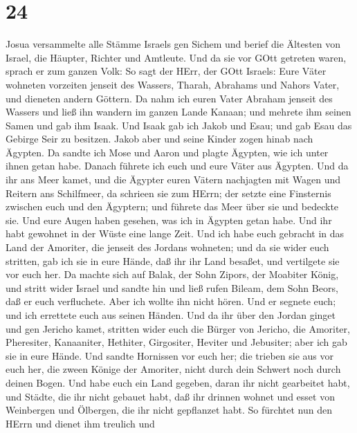 \hypertarget{section-23}{%
\section{24}\label{section-23}}

 Josua versammelte alle Stämme Israels gen Sichem und berief
die Ältesten von Israel, die Häupter, Richter und Amtleute. Und da sie
vor GOtt getreten waren,  sprach er zum ganzen Volk: So sagt
der HErr, der GOtt Israels: Eure Väter wohneten vorzeiten jenseit des
Wassers, Tharah, Abrahams und Nahors Vater, und dieneten andern Göttern.
 Da nahm ich euren Vater Abraham jenseit des Wassers und
ließ ihn wandern im ganzen Lande Kanaan; und mehrete ihm seinen Samen
und gab ihm Isaak.  Und Isaak gab ich Jakob und Esau; und
gab Esau das Gebirge Seir zu besitzen. Jakob aber und seine Kinder zogen
hinab nach Ägypten.  Da sandte ich Mose und Aaron und plagte
Ägypten, wie ich unter ihnen getan habe.  Danach führete ich
euch und eure Väter aus Ägypten. Und da ihr ans Meer kamet, und die
Ägypter euren Vätern nachjagten mit Wagen und Reitern ans Schilfmeer,
 da schrieen sie zum HErrn; der setzte eine Finsternis
zwischen euch und den Ägyptern; und führete das Meer über sie und
bedeckte sie. Und eure Augen haben gesehen, was ich in Ägypten getan
habe. Und ihr habt gewohnet in der Wüste eine lange Zeit. 
Und ich habe euch gebracht in das Land der Amoriter, die jenseit des
Jordans wohneten; und da sie wider euch stritten, gab ich sie in eure
Hände, daß ihr ihr Land besaßet, und vertilgete sie vor euch her.
 Da machte sich auf Balak, der Sohn Zipors, der Moabiter
König, und stritt wider Israel und sandte hin und ließ rufen Bileam, dem
Sohn Beors, daß er euch verfluchete.  Aber ich wollte ihn
nicht hören. Und er segnete euch; und ich errettete euch aus seinen
Händen.  Und da ihr über den Jordan ginget und gen Jericho
kamet, stritten wider euch die Bürger von Jericho, die Amoriter,
Pheresiter, Kanaaniter, Hethiter, Girgositer, Heviter und Jebusiter;
aber ich gab sie in eure Hände.  Und sandte Hornissen vor
euch her; die trieben sie aus vor euch her, die zween Könige der
Amoriter, nicht durch dein Schwert noch durch deinen Bogen.
 Und habe euch ein Land gegeben, daran ihr nicht gearbeitet
habt, und Städte, die ihr nicht gebauet habt, daß ihr drinnen wohnet und
esset von Weinbergen und Ölbergen, die ihr nicht gepflanzet habt.
 So fürchtet nun den HErrn und dienet ihm treulich und
